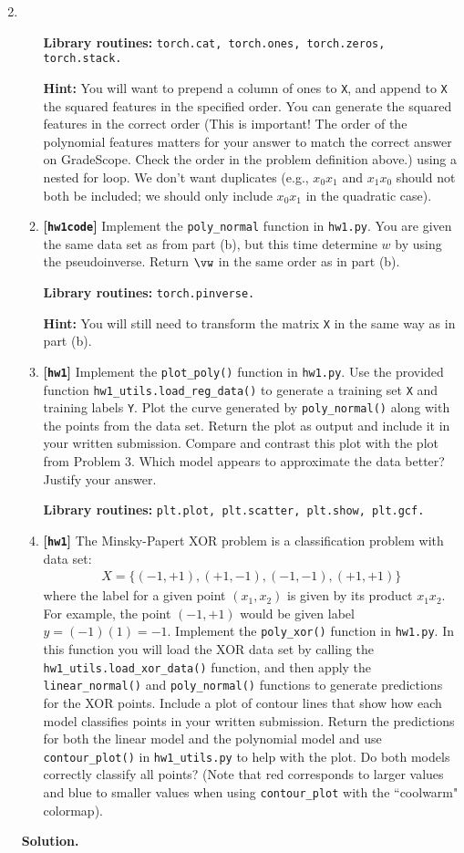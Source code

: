 \documentclass{article}
\def\hw{\textbf{[\texttt{hw1}]}\xspace}
\def\hwcode{\textbf{[\texttt{hw1code}]}\xspace}
\theoremstyle{definition}
\theoremstyle{remark}
\newenvironment{Q}
{%
  \clearpage
  \item
  }
  {%
    \phantom{s} %
    \bigskip
    \textbf{Solution.}
  }
\begin{document}
\begin{enumerate}[font={\Large\bfseries},left=0pt]
\begin{Q}
\begin{enumerate}
  \textbf{Library routines:} \texttt{torch.cat, torch.ones, torch.zeros, torch.stack.}
  
  \textbf{Hint:} You will want to prepend a column of ones to \texttt{X}, and append to \texttt{X} the squared features in the specified order. You can generate the squared features in the correct order (This is important! The order of the polynomial features matters for your answer to match the correct answer on GradeScope. Check the order in the problem definition above.) using a nested for loop. We don't want duplicates (e.g., $x_0 x_1$ and $x_1 x_0$ should not both be included; we should only include $x_0 x_1$ in the quadratic case).
  
  \item \hwcode Implement the \texttt{poly\_normal} function in \texttt{hw1.py}.  You are given the same data set as from part (b), but this time determine $w$ by using the pseudoinverse.  Return $\vw$ in the same order as in part (b).
  
  \textbf{Library routines:} \texttt{torch.pinverse.}
  
  \textbf{Hint:} You will still need to transform the matrix \texttt{X} in the same way as in part (b).
  
  \item \hw Implement the \texttt{plot\_poly()} function in \texttt{hw1.py}.  Use the provided function \texttt{hw1\_utils.load\_reg\_data()} to generate a training set \texttt{X} and training labels \texttt{Y}. Plot the curve generated by \texttt{poly\_normal()} along with the points from the data set.  Return the plot as output and include it in your written submission.  Compare and contrast this plot with the plot from Problem 3.  Which model appears to approximate the data better? Justify your answer.
  
  \textbf{Library routines:} \texttt{plt.plot, plt.scatter, plt.show, plt.gcf.}
  
  \item \hw The Minsky-Papert XOR problem is a classification problem with data set: \begin{align*}
  X = \{(-1,+1), (+1,-1), (-1,-1),(+1,+1)\}
\end{align*}
where the label for a given point $(x_1,x_2)$ is given by its product $x_1x_2$.  For example, the point $(-1,+1)$ would be given label $y = (-1)(1) = -1$.  Implement the \texttt{poly\_xor()} function in \texttt{hw1.py}.  In this function you will load the XOR data set by calling the \texttt{hw1\_utils.load\_xor\_data()} function, and then apply the \texttt{linear\_normal()} and \texttt{poly\_normal()} functions to generate predictions for the XOR points. Include a plot of contour lines that show how each model classifies points in your written submission. Return the predictions for both the linear model and the polynomial model and use \texttt{contour\_plot()} in \texttt{hw1\_utils.py} to help with the plot. Do both models correctly classify all points? (Note that red corresponds to larger values and blue to smaller values when using \texttt{contour\_plot} with the ``coolwarm" colormap).


\end{enumerate}
\end{Q}
\end{enumerate}
\end{document}
